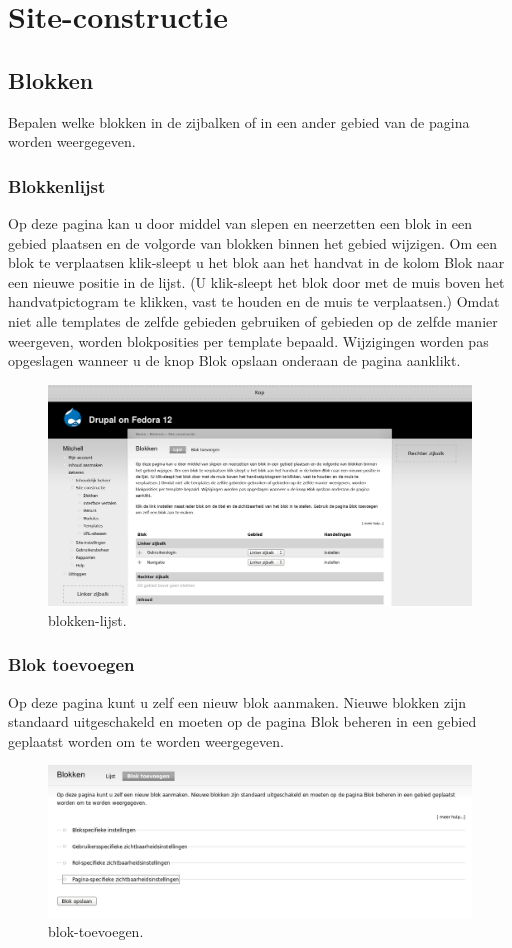 \chapter{Site-constructie} 
\section{Blokken}
Bepalen welke blokken in de zijbalken of in een ander gebied van de pagina
worden weergegeven.
\subsection{Blokkenlijst} 
Op deze pagina kan u door middel van slepen en neerzetten een blok in een gebied
plaatsen en de volgorde van blokken binnen het gebied wijzigen. Om een blok te verplaatsen 
klik-sleept u het blok aan het handvat in de kolom Blok naar een nieuwe positie in de lijst. 
(U klik-sleept het blok door met de muis boven het handvatpictogram te klikken, vast te houden 
en de muis te verplaatsen.) Omdat niet alle templates de zelfde gebieden gebruiken of gebieden 
op de zelfde manier weergeven, worden blokposities per template bepaald. Wijzigingen worden 
pas opgeslagen wanneer u de knop Blok opslaan onderaan de pagina aanklikt.
\begin{figure}[!h]
    \centering
   \includegraphics[scale=0.3,angle=0]{blokken-lijst}
   \caption{blokken-lijst.\label{white}}
 \end{figure}
 \subsection{Blok toevoegen} 
 Op deze pagina kunt u zelf een nieuw blok aanmaken. Nieuwe blokken zijn
 standaard uitgeschakeld en moeten op de pagina Blok beheren in een gebied geplaatst worden om te worden weergegeven.
 \begin{figure}[!h]
    \centering
   \includegraphics[scale=0.3,angle=0]{blok-toevoegen}
   \caption{blok-toevoegen.\label{white}}
 \end{figure}
